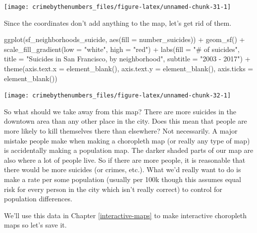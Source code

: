 \documentclass[
  12pt,
  openany]{book}
\newenvironment{Shaded}{\begin{snugshade}}{\end{snugshade}}
\newcommand{\AttributeTok}[1]{\textcolor[rgb]{0.61,0.61,0.61}{#1}}
\newcommand{\FunctionTok}[1]{\textcolor[rgb]{0,0,0}{#1}}
\newcommand{\NormalTok}[1]{#1}
\newcommand{\SpecialCharTok}[1]{\textcolor[rgb]{0,0,0}{#1}}
\newcommand{\StringTok}[1]{\textcolor[rgb]{0.5,0.5,0.5}{#1}}
\begin{document}
\begin{center}\texttt{[image: crimebythenumbers\_files/figure-latex/unnamed-chunk-31-1]} \end{center}

Since the coordinates don't add anything to the map, let's get rid of them.

\begin{Shaded}
\begin{Highlighting}[]
\FunctionTok{ggplot}\NormalTok{(sf\_neighborhoods\_suicide, }\FunctionTok{aes}\NormalTok{(}\AttributeTok{fill =}\NormalTok{ number\_suicides)) }\SpecialCharTok{+}
  \FunctionTok{geom\_sf}\NormalTok{() }\SpecialCharTok{+}
  \FunctionTok{scale\_fill\_gradient}\NormalTok{(}\AttributeTok{low =} \StringTok{"white"}\NormalTok{, }\AttributeTok{high =} \StringTok{"red"}\NormalTok{) }\SpecialCharTok{+}
  \FunctionTok{labs}\NormalTok{(}\AttributeTok{fill =} \StringTok{"\# of suicides"}\NormalTok{,}
       \AttributeTok{title =} \StringTok{"Suicides in San Francisco, by neighborhood"}\NormalTok{,}
       \AttributeTok{subtitle =} \StringTok{"2003 {-} 2017"}\NormalTok{) }\SpecialCharTok{+}
  \FunctionTok{theme}\NormalTok{(}\AttributeTok{axis.text.x =} \FunctionTok{element\_blank}\NormalTok{(),}
        \AttributeTok{axis.text.y =} \FunctionTok{element\_blank}\NormalTok{(),}
        \AttributeTok{axis.ticks =} \FunctionTok{element\_blank}\NormalTok{())}
\end{Highlighting}
\end{Shaded}

\begin{center}\texttt{[image: crimebythenumbers\_files/figure-latex/unnamed-chunk-32-1]} \end{center}

So what should we take away from this map? There are more suicides in the downtown area than any other place in the city. Does this mean that people are more likely to kill themselves there than elsewhere? Not necessarily. A major mistake people make when making a choropleth map (or really any type of map) is accidentally making a population map. The darker shaded parts of our map are also where a lot of people live. So if there are more people, it is reasonable that there would be more suicides (or crimes, etc.). What we'd really want to do is make a rate per some population (usually per 100k though this assumes equal risk for every person in the city which isn't really correct) to control for population differences.

We'll use this data in Chapter \ref{interactive-maps} to make interactive choropleth maps so let's save it.
\end{document}
